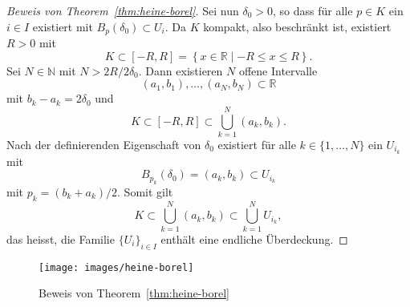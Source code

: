 \documentclass[../main.tex]{subfiles}
\begin{document}
\begin{proof}[Beweis von Theorem~\ref{thm:heine-borel}]
  Sei nun $\delta_0 > 0$, so dass
  für alle $p \in K$ 
  ein $i \in I$ existiert
  mit $B_p(\delta_0) \subset U_i$.
  Da $K$ kompakt, also beschränkt ist,
  existiert $R > 0$ mit \[K \subset
  [-R, R] = \left\{x \in \mathbb{R} \mid 
-R \leq x \leq R\right\}.\]
  Sei $N \in \mathbb{N}$ 
  mit $N > 2R/2\delta_0$.
  Dann existieren $N$ offene Intervalle
  \[
    (a_1, b_1), \dots, (a_N, b_N) \subset \mathbb{R}
  \]
  mit $b_k - a_k = 2 \delta_0$
  und
  \[
    K \subset [-R, R] \subset \bigcup_{k=1}^{N}(a_k, b_k).
  \]
  Nach der definierenden Eigenschaft von $\delta_0$
  existiert
  für alle $k \in \{1, \dots , N \}$ 
  ein $U_{i_k}$ mit
  \[
    B_{p_k}(\delta_0) = (a_k, b_k) \subset U_{i_k}
  \]
  mit $p_k = (b_k + a_k)/2$.
  Somit gilt
  \[
    K \subset \bigcup_{k=1}^{N} (a_k, b_k) \subset
    \bigcup_{k=1}^{N} U_{i_k},
  \]
  das heisst, die Familie ${\{U_i\}}_{i \in I}$ enthält
  eine endliche Überdeckung.
\end{proof}

\begin{figure}[htb]
  \centering
  \texttt{[image: images/heine-borel]}
  \caption{Beweis von Theorem~\ref{thm:heine-borel}}%
  \label{fig:heine-borel}
\end{figure}
\end{document}
